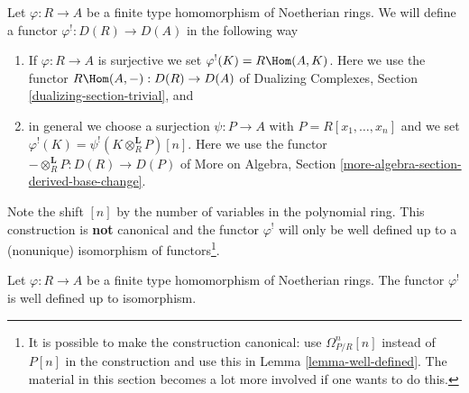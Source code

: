 \medskip\noindent
Let $\varphi : R \to A$ be a finite type homomorphism of Noetherian rings.
We will define a functor $\varphi^! : D(R) \to D(A)$ in the following way
\begin{enumerate}
\item If $\varphi : R \to A$ is surjective we set
$\varphi^!(K) = R\Hom(A, K)$. Here we use the functor
$R\Hom(A, -) : D(R) \to D(A)$ of
Dualizing Complexes, Section \ref{dualizing-section-trivial}, and
\item in general we choose a surjection $\psi : P \to A$ with
$P = R[x_1, \ldots, x_n]$ and we set
$\varphi^!(K) = \psi^!(K \otimes_R^\mathbf{L} P)[n]$.
Here we use the functor
$- \otimes_R^\mathbf{L} P : D(R) \to D(P)$
of More on Algebra, Section \ref{more-algebra-section-derived-base-change}.
\end{enumerate}
Note the shift $[n]$ by the number of variables in the polynomial
ring. This construction is {\bf not} canonical and the functor
$\varphi^!$ will only be well defined up to a (nonunique) isomorphism of
functors\footnote{It is possible to make the construction canonical:
use $\Omega^n_{P/R}[n]$ instead of $P[n]$ in the
construction and use this in Lemma \ref{lemma-well-defined}.
The material in this section becomes a lot more involved
if one wants to do this.}.

\begin{lemma}
\label{lemma-well-defined}
Let $\varphi : R \to A$ be a finite type homomorphism of
Noetherian rings. The functor $\varphi^!$ is well defined
up to isomorphism.
\end{lemma}

